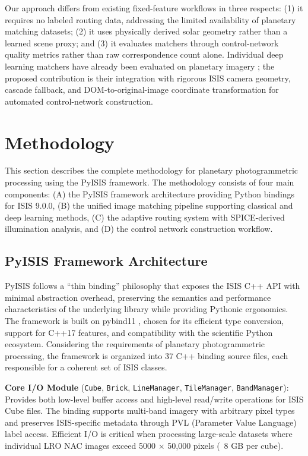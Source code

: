 \documentclass[lettersize,journal]{IEEEtran}
\newcommand{\pyisis}{PyISIS}
\begin{document}
Our approach differs from existing fixed-feature workflows in three respects: (1) it requires no labeled routing data, addressing the limited availability of planetary matching datasets; (2) it uses physically derived solar geometry rather than a learned scene proxy; and (3) it evaluates matchers through control-network quality metrics rather than raw correspondence count alone. Individual deep learning matchers have already been evaluated on planetary imagery \cite{ye2024planetary,yutu2_2024}; the proposed contribution is their integration with rigorous ISIS camera geometry, cascade fallback, and DOM-to-original-image coordinate transformation for automated control-network construction.


\section{Methodology}\label{sec:methodology}

This section describes the complete methodology for planetary photogrammetric processing using the \pyisis{} framework. The methodology consists of four main components: (A) the \pyisis{} framework architecture providing Python bindings for ISIS 9.0.0, (B) the unified image matching pipeline supporting classical and deep learning methods, (C) the adaptive routing system with SPICE-derived illumination analysis, and (D) the control network construction workflow.

\subsection{PyISIS Framework Architecture}

\pyisis{} follows a ``thin binding'' philosophy that exposes the ISIS C++ API with minimal abstraction overhead, preserving the semantics and performance characteristics of the underlying library while providing Pythonic ergonomics. The framework is built on pybind11 \cite{jakob2017pybind11}, chosen for its efficient type conversion, support for C++17 features, and compatibility with the scientific Python ecosystem. Considering the requirements of planetary photogrammetric processing, the framework is organized into 37 C++ binding source files, each responsible for a coherent set of ISIS classes.

\textbf{Core I/O Module} (\texttt{Cube}, \texttt{Brick}, \texttt{LineManager}, \texttt{TileManager}, \texttt{BandManager}): Provides both low-level buffer access and high-level read/write operations for ISIS Cube files. The binding supports multi-band imagery with arbitrary pixel types and preserves ISIS-specific metadata through PVL (Parameter Value Language) label access. Efficient I/O is critical when processing large-scale datasets where individual LRO NAC images exceed 5000 $\times$ 50,000 pixels (~8 GB per cube).
\end{document}
